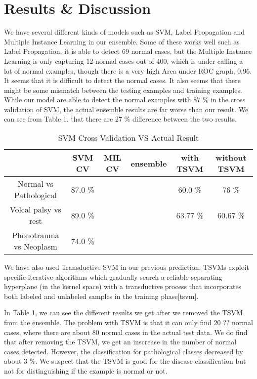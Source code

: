 \section{Results \& Discussion}


We have several different kinds of models such as SVM, Label Propagation and Multiple Instance Learning in our ensemble. Some of these works well such as Label Propagation, it is able to detect 69 normal cases, but the Multiple Instance Learning is only capturing 12 normal cases out of 400, which is under calling a lot of normal examples, though there is a very high Area under ROC graph, 0.96. It seems that it is difficult to detect the normal cases. It also seems that there might be some mismatch between the testing examples and training examples. While our model are able to detect the normal examples with 87 \% in the cross validation of SVM, the actual ensemble results are far worse than our result. We can see from Table 1. that there are 27 \% difference between the two results. 


\begin{table*}[!htbp]
	\caption{SVM Cross Validation VS Actual Result}
	\begin{center}
		\begin{tabular}{|c|c|c|c|c|c|}
			\hline
			 & SVM CV & MIL CV & ensemble & with TSVM & without TSVM \\
			\hline
			Normal vs Pathological & 87.0 \%& & & 60.0 \% & 76 \%  \\
			\hline
			Volcal palsy vs rest & 89.0 \% & && 63.77 \%& 60.67 \%\\
			\hline
			Phonotrauma vs Neoplasm & 74.0 \% &&& &\\
			\hline
		\end{tabular}
		\label{tab2}
	\end{center}
\end{table*}

We have also used Transductive SVM in our previous prediction. TSVMs exploit specific iterative algorithms which gradually search a reliable separating hyperplane (in the kernel space) with a transductive process that incorporates both labeled and unlabeled samples in the training phase[tsvm].

In Table 1, we can see the different results we get after we removed the TSVM from the ensemble. The problem with TSVM is that it can only find 20 ?? normal cases, where there are about 80 normal cases in the actual test data. We do find that after removing the TSVM, we get an inscrease in the number of normal cases detected. However, the classification for pathological classes decreased by about 3 \%. We suspect that the TSVM is good for the disease classification but not for distinguishing if the example is normal or not. 
